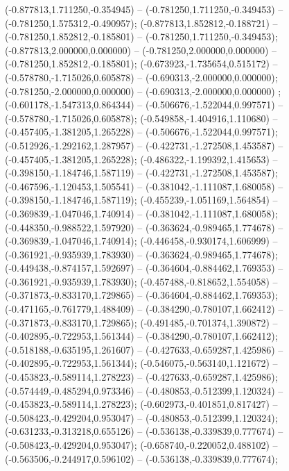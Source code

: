  (-0.877813,1.711250,-0.354945) -- (-0.781250,1.711250,-0.349453) -- (-0.781250,1.575312,-0.490957);
 (-0.877813,1.852812,-0.188721) -- (-0.781250,1.852812,-0.185801) -- (-0.781250,1.711250,-0.349453);
 (-0.877813,2.000000,0.000000) -- (-0.781250,2.000000,0.000000) -- (-0.781250,1.852812,-0.185801);
 (-0.673923,-1.735654,0.515172) -- (-0.578780,-1.715026,0.605878) -- (-0.690313,-2.000000,0.000000);
 (-0.781250,-2.000000,0.000000) -- (-0.690313,-2.000000,0.000000) ;
 (-0.601178,-1.547313,0.864344) -- (-0.506676,-1.522044,0.997571) -- (-0.578780,-1.715026,0.605878);
 (-0.549858,-1.404916,1.110680) -- (-0.457405,-1.381205,1.265228) -- (-0.506676,-1.522044,0.997571);
 (-0.512926,-1.292162,1.287957) -- (-0.422731,-1.272508,1.453587) -- (-0.457405,-1.381205,1.265228);
 (-0.486322,-1.199392,1.415653) -- (-0.398150,-1.184746,1.587119) -- (-0.422731,-1.272508,1.453587);
 (-0.467596,-1.120453,1.505541) -- (-0.381042,-1.111087,1.680058) -- (-0.398150,-1.184746,1.587119);
 (-0.455239,-1.051169,1.564854) -- (-0.369839,-1.047046,1.740914) -- (-0.381042,-1.111087,1.680058);
 (-0.448350,-0.988522,1.597920) -- (-0.363624,-0.989465,1.774678) -- (-0.369839,-1.047046,1.740914);
 (-0.446458,-0.930174,1.606999) -- (-0.361921,-0.935939,1.783930) -- (-0.363624,-0.989465,1.774678);
 (-0.449438,-0.874157,1.592697) -- (-0.364604,-0.884462,1.769353) -- (-0.361921,-0.935939,1.783930);
 (-0.457488,-0.818652,1.554058) -- (-0.371873,-0.833170,1.729865) -- (-0.364604,-0.884462,1.769353);
 (-0.471165,-0.761779,1.488409) -- (-0.384290,-0.780107,1.662412) -- (-0.371873,-0.833170,1.729865);
 (-0.491485,-0.701374,1.390872) -- (-0.402895,-0.722953,1.561344) -- (-0.384290,-0.780107,1.662412);
 (-0.518188,-0.635195,1.261607) -- (-0.427633,-0.659287,1.425986) -- (-0.402895,-0.722953,1.561344);
 (-0.546075,-0.563140,1.121672) -- (-0.453823,-0.589114,1.278223) -- (-0.427633,-0.659287,1.425986);
 (-0.574449,-0.485294,0.973346) -- (-0.480853,-0.512399,1.120324) -- (-0.453823,-0.589114,1.278223);
 (-0.602973,-0.401851,0.817427) -- (-0.508423,-0.429204,0.953047) -- (-0.480853,-0.512399,1.120324);
 (-0.631233,-0.313218,0.655126) -- (-0.536138,-0.339839,0.777674) -- (-0.508423,-0.429204,0.953047);
 (-0.658740,-0.220052,0.488102) -- (-0.563506,-0.244917,0.596102) -- (-0.536138,-0.339839,0.777674);
